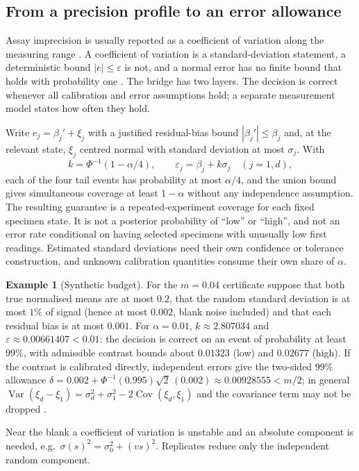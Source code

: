\documentclass[11pt]{article}
\theoremstyle{plain}
\theoremstyle{definition}
\newtheorem{example}[theorem]{Example}
\numberwithin{equation}{section}
\newcommand{\eps}{\varepsilon}
\begin{document}
\subsection{From a precision profile to an error allowance}\label{sec:precision}
Assay imprecision is usually reported as a coefficient of variation along the
measuring range \cite{dudley1985,sadler1988}. A coefficient of variation is a
standard-deviation statement, a deterministic bound $|e|\le\eps$ is not, and a
normal error has no finite bound that holds with probability one \cite{gum2008}.
The bridge has two layers. The decision is correct whenever all calibration and
error assumptions hold; a separate measurement model states how often they hold.

Write $e_j=\beta_j'+\xi_j$ with a justified residual-bias bound
$|\beta_j'|\le\beta_j$ and, at the relevant state, $\xi_j$ centred normal with
standard deviation at most $\sigma_j$. With
\begin{equation}\label{eq:coverage}
 k=\Phi^{-1}(1-\alpha/4),\qquad\eps_j=\beta_j+k\sigma_j\quad(j=1,d),
\end{equation}
each of the four tail events has probability at most $\alpha/4$, and the union
bound gives simultaneous coverage at least $1-\alpha$ without any independence
assumption. The resulting guarantee is a repeated-experiment coverage for each fixed
specimen state. It is not a posterior probability of ``low'' or ``high'', and not an
error rate conditional on having selected specimens with unusually low first
readings. Estimated standard deviations need their own confidence or tolerance
construction, and unknown calibration quantities consume their own share of
$\alpha$.

\begin{example}[Synthetic budget]\label{ex:cv}
For the $m=0.04$ certificate suppose that both true normalised means are at most
$0.2$, that the random standard deviation is at most $1\%$ of signal (hence at most
$0.002$, blank noise included) and that each residual bias is at most $0.001$. For
$\alpha=0.01$, $k\approx2.807034$ and $\eps\approx0.00661407<0.01$: the decision is
correct on an event of probability at least $99\%$, with admissible contrast bounds
about $0.01323$ (low) and $0.02677$ (high). If the contrast is calibrated directly,
independent errors give the two-sided $99\%$ allowance
$\delta=0.002+\Phi^{-1}(0.995)\sqrt2\,(0.002)\approx0.00928555<m/2$; in general
$\operatorname{Var}(\xi_d-\xi_1)=\sigma_d^2+\sigma_1^2-2\operatorname{Cov}(\xi_d,\xi_1)$
and the covariance term may not be dropped \cite{gum2008}.
\end{example}
Near the blank a coefficient of variation is unstable and an absolute component is
needed, e.g.\ $\sigma(s)^2=\sigma_0^2+(vs)^2$. Replicates reduce only the independent
random component.
\end{document}
